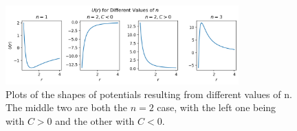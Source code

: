 \documentclass[letterpaper, reqno,11pt]{article}
\begin{document}
\begin{figure}[htpb]
    \centering
    \includegraphics[width=0.8\textwidth]{U-plots}
    \caption{Plots of the shapes of potentials resulting from different values of n. The middle two are both the $n=2$ case, with the left one being with $C>0$ and the other with $C<0$. }
    \label{fig:U-plots}
\end{figure}
\end{document}
